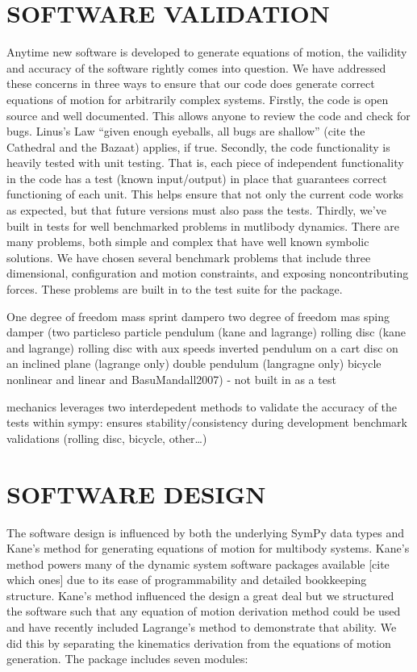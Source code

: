 \documentclass[twocolumn,10pt]{asme2e}
\begin{document}
\section*{SOFTWARE VALIDATION}
Anytime new software is developed to generate equations of motion, the
vailidity and accuracy of the software rightly comes into question. We have
addressed these concerns in three ways to ensure that our code does generate
correct equations of motion for arbitrarily complex systems. Firstly, the code
is open source and well documented. This allows anyone to review the code and
check for bugs. Linus's Law ``given enough eyeballs, all bugs
are shallow'' (cite the Cathedral and the Bazaat) applies, if true.
Secondly, the code functionality is heavily tested with unit testing.  That is,
each piece of independent functionality in the code has a test (known
input/output) in place that guarantees correct functioning of each unit. This
helps ensure that not only the current code works as expected, but that future
versions must also pass the tests. Thirdly, we've built in tests for well
benchmarked problems in mutlibody dynamics. There are many problems, both
simple and complex that have well known symbolic solutions. We have chosen
several benchmark problems that include three dimensional, configuration and
motion constraints, and exposing noncontributing forces. These problems are
built in to the test suite for the package.

One degree of freedom mass sprint dampero
two degree of freedom mas sping damper (two particleso
particle pendulum (kane and lagrange)
rolling disc (kane and lagrange)
rolling disc with aux speeds
inverted pendulum on a cart
disc on an inclined plane (lagrange only)
double pendulum (langragne only)
bicycle nonlinear and linear \cite{Meijaard2007} and BasuMandall2007) - not built in as a test

mechanics leverages two interdepedent methods to validate the accuracy of the
tests within sympy: ensures stability/consistency during development
benchmark validations (rolling disc, bicycle, other\ldots)
%
\section*{SOFTWARE DESIGN}
The software design is influenced by both the underlying SymPy data types and
Kane’s method for generating equations of motion for multibody systems. Kane’s
method powers many of the dynamic system software packages available [cite
which ones] due to its ease of programmability and detailed bookkeeping
structure. Kane’s method influenced the design a great deal but we structured
the software such that any equation of motion derivation method could be used
and have recently included Lagrange’s method to demonstrate that ability. We
did this by separating the kinematics derivation from the equations of motion
generation. The package includes seven modules:
\end{document}
